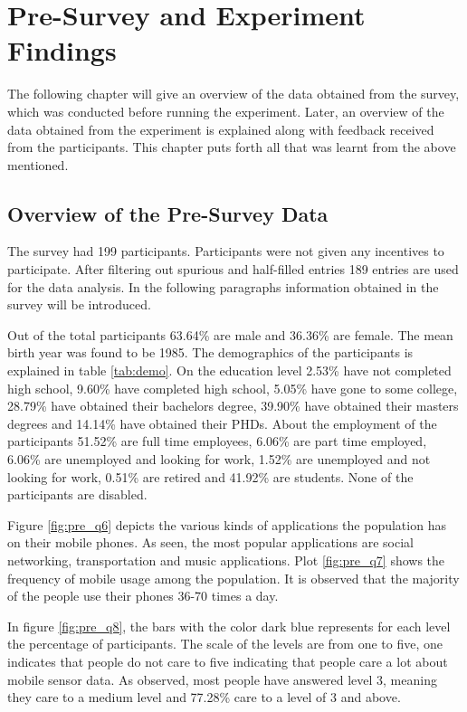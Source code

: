 


\chapter{Pre-Survey and Experiment Findings}
The following chapter will give an overview of the data obtained from the survey, which was conducted before running the experiment.
Later, an overview of the data obtained from the experiment is explained along with feedback received from the participants. This chapter puts forth
all that was learnt from the above mentioned.

\section{Overview of the Pre-Survey Data}
The survey had 199 participants. Participants were not given any incentives to participate. After filtering out spurious and half-filled entries 189 entries are used for the data analysis. In the following paragraphs information obtained in the survey will be introduced.

Out of the total
participants 63.64\% are male and 36.36\% are female. The mean birth year was found to be 1985. The demographics of the participants is explained in table \ref{tab:demo}. On the education level 2.53\% have not completed high school, 9.60\% have completed high school, 5.05\% have gone to some college, 28.79\% have obtained their bachelors degree, 39.90\% have obtained their masters degrees and 14.14\% have obtained their PHDs. About the employment of the participants 51.52\% are full time employees, 6.06\% are part time employed, 6.06\% are unemployed and looking for work, 1.52\% are unemployed and not looking for work, 0.51\% are retired and 41.92\% are students. None of the participants are disabled. 

Figure \ref{fig:pre_q6} depicts the various kinds of applications the population has on their mobile phones. As seen, the most popular applications are social networking, transportation and music applications. Plot \ref{fig:pre_q7} shows the frequency of mobile usage among the population. It is observed that the majority of the people use their phones 36-70 times a day.

In figure \ref{fig:pre_q8}, the bars with the color dark blue represents for each level the percentage of participants. The scale of the levels are from one to five, one indicates that people do not care to five indicating that people care a lot about mobile sensor data. As observed, most people have answered level 3, meaning they care to a medium level and 77.28\% care to a level of 3 and above.

